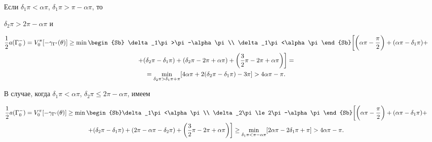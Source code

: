 Если $\delta_1\pi<\alpha\pi$, $\delta_1\pi>\pi-\alpha\pi$, то


$\delta_2\pi>2\pi-\alpha\pi$ и


\begin{multline*}


\frac12 a({\Gamma }_0^{-})=V_0^\pi[-\gamma_{{\Gamma }'}(\theta)]\ge


\min\begin{Sb} \delta_1\pi>\pi-\alpha\pi\\ \delta_1\pi


<\alpha\pi\end{Sb}\bigg[\bigg(\alpha\pi-\frac\pi2\bigg)+(\alpha\pi-


\delta_1\pi)+ \\


%


+(\delta_2\pi-\delta_1\pi)+(\delta_2\pi-2\pi+\alpha\pi)+


\bigg(\frac32 \pi-2\pi+\alpha\pi\bigg)\bigg]=\\


%


=\min\limits_{\delta_2\pi>\delta_1\pi+\pi}[4\alpha\pi+2(\delta_2\pi-


\delta_1\pi)-3\pi]>4\alpha\pi-\pi.


\end{multline*}





В случае, когда $\delta_1\pi<\alpha\pi$, $\delta_2\pi\le 2\pi-\alpha


\pi$, имеем


\begin{multline*}


\frac12 a({\Gamma }_0^{-})=V_0^\pi[-\gamma_{{\Gamma }'}(\theta)]\ge


\min\begin{Sb}\delta_1\pi<\alpha\pi\\ \delta_2\pi


\le 2\pi-\alpha\pi\end{Sb}\bigg[\bigg(\alpha\pi-\frac\pi2\bigg)+(\alpha\pi-


\delta_1\pi)+ \\


%


+(\delta_2\pi-\delta_1\pi)+(2\pi-\alpha\pi-\delta_2\pi)+


\bigg(\frac32 \pi-2\pi+\alpha\pi\bigg)\bigg]\ge\min\limits_


{\delta_1\pi<\pi-\alpha\pi}[2\alpha\pi-2\delta_1\pi+\pi]>


4\alpha\pi-\pi.


\end{multline*}





